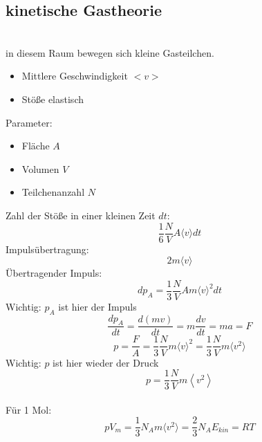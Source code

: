\documentclass[a4paper, fleqn]{article}
\begin{document}
\subsection{kinetische Gastheorie}
\\
in diesem Raum bewegen sich kleine Gasteilchen.
\begin{itemize}
    \item Mittlere Geschwindigkeit $<v>$
    \item Stöße elastisch
\end{itemize}
Parameter:
\begin{itemize}
    \item Fläche $A$
    \item Volumen $V$
    \item Teilchenanzahl $N$
\end{itemize}
Zahl der Stöße in einer kleinen Zeit $dt$:
\begin{equation*}
    \frac{1}{6} \frac{N}{V}A\langle v\rangle dt
\end{equation*}
Impulsübertragung:
\begin{equation*}
    2m\langle v \rangle
\end{equation*}
Übertragender Impuls:
\begin{equation*}
    dp_A = \frac{1}{3}\frac{N}{V}Am \langle v \rangle ^2 dt
\end{equation*}
Wichtig: $p_A$ ist hier der Impuls
\begin{equation*}
    \frac{dp_A}{dt}=\frac{d\left(mv\right)}{dt}=m\frac{dv}{dt}=ma=F
\end{equation*}
\begin{equation*}
    p = \frac{F}{A}=\frac{1}{3}\frac{N}{V}m\langle v\rangle ^2= \frac{1}{3}\frac{N}{V}m \langle v^2 \rangle
\end{equation*}
Wichtig: $p$ ist hier wieder der Druck
\begin{equation*}
    p=\frac{1}{3}\frac{N}{V}m\left\langle v^2 \right\rangle 
\end{equation*}
\\
Für 1 Mol:
\begin{equation*}
    pV_m=\frac{1}{3}N_Am\langle v^2\rangle = \frac{2}{3}N_AE_{kin}=RT
\end{equation*}
\end{document}
